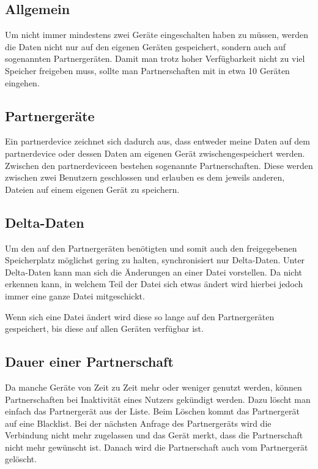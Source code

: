 \subsection{Allgemein}
Um nicht immer mindestens zwei Geräte eingeschalten haben zu müssen, werden die Daten nicht nur auf den eigenen Geräten gespeichert, sondern auch auf sogenannten Partnergeräten. Damit man trotz hoher Verfügbarkeit nicht zu viel Speicher freigeben muss, sollte man Partnerschaften mit in etwa 10 Geräten eingehen. 

\subsection{Partnergeräte} \label{Partnergerät}
Ein \gls{partnerdevice} zeichnet sich dadurch aus, dass entweder meine Daten auf dem \gls{partnerdevice} oder dessen Daten am eigenen Gerät zwischengespeichert werden. Zwischen den \gls{partnerdevice}en bestehen sogenannte Partnerschaften. Diese werden zwischen zwei Benutzern geschlossen und erlauben es dem jeweils anderen, Dateien auf einem eigenen Gerät zu speichern.

\subsection{Delta-Daten}
Um den auf den Partnergeräten benötigten und somit auch den freigegebenen Speicherplatz möglichst gering zu halten, synchronisiert \sblit nur Delta-Daten. Unter Delta-Daten kann man sich die Änderungen an einer Datei vorstellen. Da \sblit nicht erkennen kann, in welchem Teil der Datei sich etwas ändert wird hierbei jedoch immer eine ganze Datei mitgeschickt.

Wenn sich eine Datei ändert wird diese so lange auf den Partnergeräten gespeichert, bis diese auf allen Geräten verfügbar ist.

\subsection{Dauer einer Partnerschaft}
Da manche Geräte von Zeit zu Zeit mehr oder weniger genutzt werden, können Partnerschaften bei Inaktivität eines Nutzers gekündigt werden. Dazu löscht man einfach das Partnergerät aus der Liste. Beim Löschen kommt das Partnergerät auf eine Blacklist. Bei der nächsten Anfrage des Partnergeräts wird die Verbindung nicht mehr zugelassen und das Gerät merkt, dass die Partnerschaft nicht mehr gewünscht ist. Danach wird die Partnerschaft auch vom Partnergerät gelöscht.

